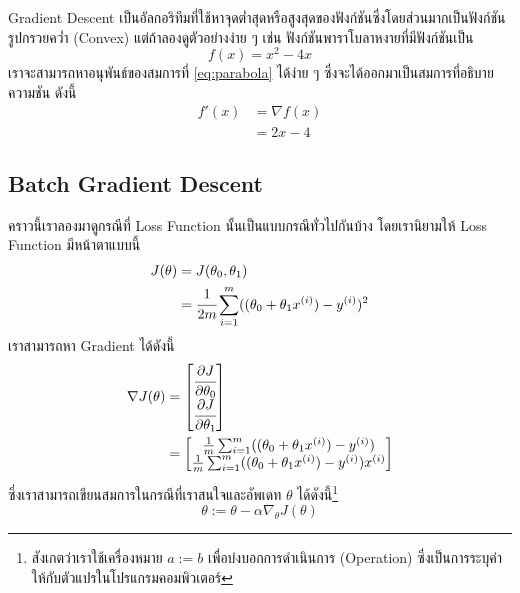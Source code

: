 Gradient Descent เป็นอัลกอริทึมที่ใช้หาจุดต่ำสุดหรือสูงสุดของฟังก์ชันซึ่งโดยส่วนมากเป็นฟังก์ชันรูปกรวยคว่ำ (Convex) แต่ถ้าลองดูตัวอย่างง่าย ๆ เช่น ฟังก์ชันพาราโบลาหงายที่มีฟังก์ชันเป็น
%
\begin{equation}\label{eq:parabola}
    f(x) = x^2 - 4x
\end{equation}
%
\noindent เราจะสามารถหาอนุพันธ์ของสมการที่ \eqref{eq:parabola} ได้ง่าย ๆ ซึ่งจะได้ออกมาเป็นสมการที่อธิบายความชัน ดังนี้
%
\begin{align}\label{eq:parabola_slope}
    f'(x) & = \nabla f(x) \nonumber \\
          & = 2x - 4
\end{align}

\subsection{Batch Gradient Descent}
\label{ssec:batch_grad}

คราวนี้เราลองมาดูกรณีที่ Loss Function นั้นเป็นแบบกรณีทั่วไปกันบ้าง โดยเรานิยามให้ Loss Function มีหน้าตาแบบนี้
%
\begin{align}\label{eq:batch_loss}
    J(\theta) & = J(\theta_0, \theta_1) \nonumber                                        \\
              & = \cfrac{1}{2m} \sum_{i=1}^m ((\theta_0 + \theta_1 x^{(i)}) - y^{(i)})^2
\end{align}
%
\noindent เราสามารถหา Gradient ได้ดังนี้
%
\begin{align}
    \nabla J (\theta) & = \begin{bmatrix} \cfrac{\partial J}{\partial \theta_0} \\ \cfrac{\partial J}{\partial
                                  \theta_1}\end{bmatrix}                 \\
                      & =  \begin{bmatrix} \frac{1}{m} \sum_{i=1}^{m} ((\theta_0 + \theta_1 x^{(i)}) - y^{(i)}) \\ \frac{1}{m}
                               \sum_{i=1}^{m} ((\theta_0 + \theta_1 x^{(i)}) - y^{(i)})x^{(i)}\end{bmatrix}
\end{align}
%
\noindent ซึ่งเราสามารถเขียนสมการในกรณีที่เราสนใจและอัพเดท $\theta$ ได้ดังนี้\footnote{สังเกตว่าเราใช้เครื่องหมาย $a := b$ เพื่อบ่งบอกการดำเนินการ (Operation) ซึ่งเป็นการระบุค่าให้กับตัวแปรในโปรแกรมคอมพิวเตอร์}
%
\begin{equation}\label{eq:batch_grad}
    \theta := \theta - \alpha\nabla_\theta J(\theta)
\end{equation}

